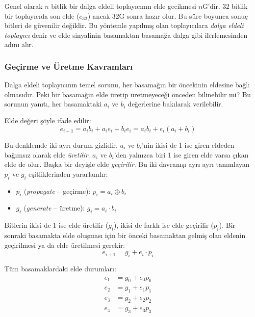 Genel olarak $n$ bitlik bir dalga eldeli toplayıcının elde gecikmesi $n$G'dir. 32 bitlik bir toplayıcıda son elde ($e_{32}$) ancak 32G sonra hazır olur. Bu süre boyunca sonuç bitleri de güvenilir değildir. Bu yöntemle yapılmış olan toplayıcılara \emph{dalga eldeli toplayıcı} denir ve elde sinyalinin basamaktan basamağa dalga gibi ilerlemesinden adını alır.

\subsubsection*{Geçirme ve Üretme Kavramları}
Dalga eldeli toplayıcının temel sorunu, her basamağın bir öncekinin eldesine bağlı olmasıdır. Peki bir basamağın elde üretip üretmeyeceği önceden bilinebilir mi? Bu sorunun yanıtı, her basamaktaki $a_i$ ve $b_i$ değerlerine bakılarak verilebilir.

Elde değeri şöyle ifade edilir:
\begin{equation}
e_{i+1} = a_i b_i + a_i e_i + b_i e_i = a_i b_i + e_i(a_i + b_i)
\label{eq:elde}
\end{equation}

Bu denklemde iki ayrı durum gizlidir. $a_i$ ve $b_i$'nin ikisi de 1 ise giren eldeden bağımsız olarak elde \emph{üretilir}. $a_i$ ve $b_i$'den yalnızca biri 1 ise giren elde varsa çıkan elde de olur. Başka bir deyişle elde \emph{geçirilir}. Bu iki davranışı ayrı ayrı tanımlayan $p_i$ ve $g_i$ eşitliklerinden yararlanılır:
\begin{itemize}
\item $p_i$ (\emph{propagate} -- geçirme): $p_i = a_i \oplus b_i$
\item $g_i$ (\emph{generate} -- üretme): $g_i = a_i \cdot b_i$
\end{itemize}

Bitlerin ikisi de 1 ise elde üretilir ($g_i$), ikisi de farklı ise elde geçirilir ($p_i$). Bir sonraki basamakta elde oluşması için bir önceki basamaktan gelmiş olan eldenin geçirilmesi ya da elde üretilmesi gerekir:
\begin{equation}
e_{i+1} = g_i + e_i \cdot p_i
\end{equation}

Tüm basamaklardaki elde durumları:
\begin{align}
e_1 &= g_0 + e_0 p_0 \label{eq:c1} \\
e_2 &= g_1 + e_1 p_1 \label{eq:c2} \\
e_3 &= g_2 + e_2 p_2 \label{eq:c3} \\
e_4 &= g_3 + e_3 p_3 \label{eq:c4}
\end{align}

